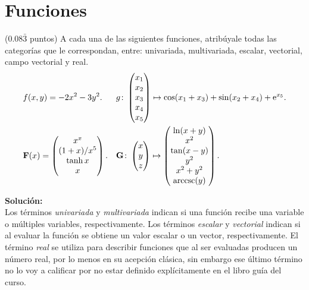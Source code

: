 \documentclass{fmbvecto}
\begin{document}

\section{Funciones}

\begin{problema}
    (\(0.08\bar{3}\) puntos) A cada una de las siguientes funciones, atribúyale todas las categorías que le correspondan, entre: univariada, multivariada, escalar, vectorial, campo vectorial y real.
    \begin{align*}
        &f(x, y) = -2x^2 - 3y^2. &&
        g\colon\begin{pmatrix}
            x_1\\x_2\\x_3\\x_4\\x_5\end{pmatrix}\mapsto\cos(x_1+x_3)+\sin(x_2+x_4)+\mathrm{e}^{x_5}.\\&
                \boldsymbol{{\mathbf{F}}}(x) = \begin{pmatrix}
                    x^{x} \\ (1+x) / x^5 \\ \tanh x \\ x
                \end{pmatrix}. &&
        \boldsymbol{{\mathbf{G}}}\colon\begin{pmatrix}
        x\\y\\z
        \end{pmatrix}\mapsto\begin{pmatrix}
        \ln(x+y) \\ x^2 \\ \tan(x-y) \\y^2 \\ x^2+y^2 \\ \operatorname{arccsc}(y)
        \end{pmatrix}.
    \end{align*}
        
\vspace{1em}
\tcblower
\textbf{Solución:}\\

Los términos \textit{univariada} y \textit{multivariada} indican si una función recibe una variable o múltiples variables, respectivamente. Los términos \textit{escalar} y \textit{vectorial} indican si al evaluar la función se obtiene un valor escalar o un vector, respectivamente. El término \textit{real} se utiliza para describir funciones que al ser evaluadas producen un número real, por lo menos en su acepción clásica, sin embargo ese último término no lo voy a calificar por no estar definido explícitamente en el libro guía del curso.


\end{problema}
\end{document}
